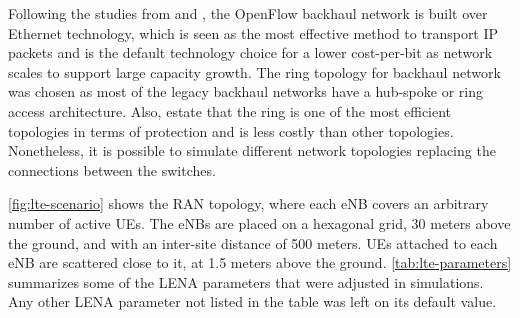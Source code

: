 Following the studies from \citet{Chundury2008} and \citet{Howard2011}, the
OpenFlow backhaul network is built over Ethernet technology, which is seen as
the most effective method to transport \ac{IP} packets and is the default
technology choice for a lower cost-per-bit as network scales to support large
capacity growth. The ring topology for backhaul network was chosen as most of
the legacy backhaul networks have a hub-spoke or ring access architecture.
Also, \citet{Nadiv2010} estate that the ring is one of the most efficient
topologies in terms of protection and is less costly than other topologies.
Nonetheless, it is possible to simulate different network topologies replacing
the connections between the switches.

\autoref{fig:lte-scenario} shows the \ac{RAN} topology, where each \ac{eNB}
covers an arbitrary number of active \acp{UE}. The \acp{eNB} are placed on a
hexagonal grid, 30 meters above the ground, and with an inter-site distance of
500 meters. \acp{UE} attached to each \ac{eNB} are scattered close to it, at
1.5 meters above the ground. \autoref{tab:lte-parameters} summarizes some of
the \ac{LENA} parameters that were adjusted in simulations. Any other \ac{LENA}
parameter not listed in the table was left on its default value.
